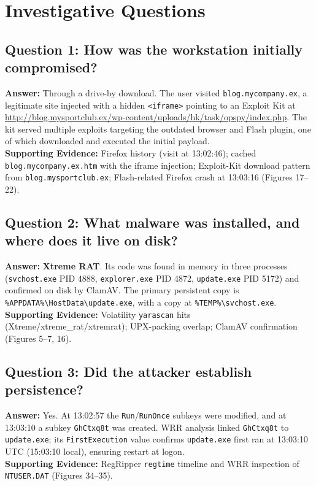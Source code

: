 \documentclass[12pt]{article}
\begin{document}
\section{Investigative Questions}

\subsection*{Question 1: How was the workstation initially compromised?}
\textbf{Answer:} Through a drive-by download. The user visited \texttt{blog.mycompany.ex}, a legitimate site injected with a hidden \texttt{<iframe>} pointing to an Exploit Kit at \url{http://blog.mysportclub.ex/wp-content/uploads/hk/task/opspy/index.php}. The kit served multiple exploits targeting the outdated browser and Flash plugin, one of which downloaded and executed the initial payload.\\
\textbf{Supporting Evidence:} Firefox history (visit at 13:02:46); cached \texttt{blog.mycompany.ex.htm} with the iframe injection; Exploit-Kit download pattern from \texttt{blog.mysportclub.ex}; Flash-related Firefox crash at 13:03:16 (Figures 17--22).

\subsection*{Question 2: What malware was installed, and where does it live on disk?}
\textbf{Answer:} \textbf{Xtreme RAT}. Its code was found in memory in three processes (\texttt{svchost.exe} PID 4888, \texttt{explorer.exe} PID 4872, \texttt{update.exe} PID 5172) and confirmed on disk by ClamAV. The primary persistent copy is \texttt{\%APPDATA\%\textbackslash HostData\textbackslash update.exe}, with a copy at \texttt{\%TEMP\%\textbackslash svchost.exe}.\\
\textbf{Supporting Evidence:} Volatility \texttt{yarascan} hits (Xtreme/xtreme\_rat/xtremrat); UPX-packing overlap; ClamAV confirmation (Figures 5--7, 16).

\subsection*{Question 3: Did the attacker establish persistence?}
\textbf{Answer:} Yes. At 13:02:57 the \texttt{Run}/\texttt{RunOnce} subkeys were modified, and at 13:03:10 a subkey \texttt{GhCtxq8t} was created. WRR analysis linked \texttt{GhCtxq8t} to \texttt{update.exe}; its \texttt{FirstExecution} value confirms \texttt{update.exe} first ran at 13:03:10 UTC (15:03:10 local), ensuring restart at logon.\\
\textbf{Supporting Evidence:} RegRipper \texttt{regtime} timeline and WRR inspection of \texttt{NTUSER.DAT} (Figures 34--35).
\end{document}
